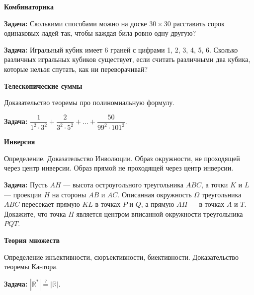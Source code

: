 \documentclass{article}
\begin{document}
\begin{enumerate_boxed}
        \item \textbf{Комбинаторика}

        \textbf{Задача:}  Сколькими способами можно на доске $30 \times 30$ расставить сорок одинаковых ладей так, чтобы каждая била ровно одну другую?

        \textbf{Задача:} Игральный кубик имеет 6 граней с цифрами 1, 2, 3, 4, 5, 6.
        Сколько различных игральных кубиков существует, если считать различными два кубика, которые нельзя спутать, как ни переворачивай?

        \item \textbf{Телескопические суммы}

        Доказательство теоремы про полиномиальную формулу.

        \textbf{Задача:} $\dfrac{1}{1^2 \cdot 3^2} + \dfrac{2}{3^2 \cdot 5^2} + \dotsc +  \dfrac{50}{99^2 \cdot 101^2}.$

        \item \textbf{Инверсия}

        Определение.
        Доказательство Инволюции.
        Образ окружности, не проходящей через центр инверсии.
        Образ прямой не проходящей через центр инверсии.

        \textbf{Задача:} Пусть $AH$ — высота остроугольного треугольника $ABC$, а точки $K$ и $L$ — проекции $H$ на стороны $AB$ и $AC$.
        Описанная окружность $\Omega$ треугольника $ABC$ пересекает прямую $KL$ в точках $P$ и $Q$, а прямую $AH$ — в точках $A$ и $T$.
        Докажите, что точка $H$ является центром вписанной окружности треугольника $PQT$.

        \item \textbf{Теория множеств}

        Определение инъективности, сюръективности, биективности.
        Доказательство теоремы Кантора.

        \textbf{Задача:}   $|\mathbb{R}^*| \stackrel{?}{=} |\mathbb{R}|.$

    \end{enumerate_boxed}
\end{document}
